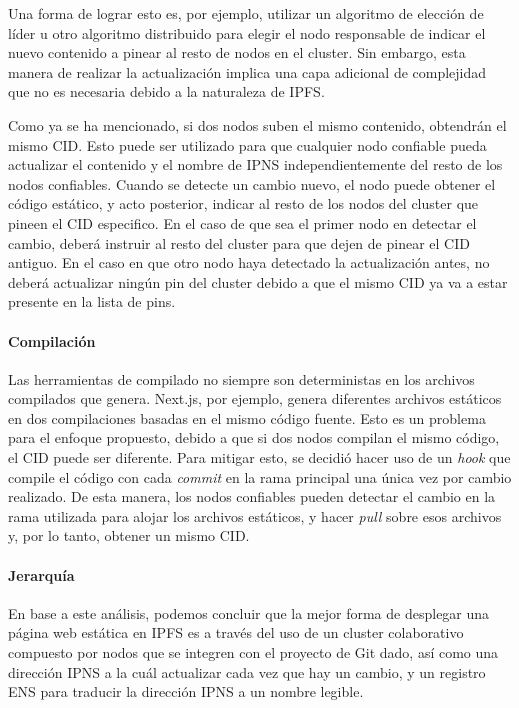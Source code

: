 Una forma de lograr esto es, por ejemplo, utilizar un algoritmo de elección de líder u otro algoritmo distribuido para elegir el nodo responsable de indicar el nuevo contenido a pinear al resto de nodos en el cluster. Sin embargo, esta manera de realizar la actualización implica una capa adicional de complejidad que no es necesaria debido a la naturaleza de IPFS.

Como ya se ha mencionado, si dos nodos suben el mismo contenido, obtendrán el mismo CID. Esto puede ser utilizado para que cualquier nodo confiable pueda actualizar el contenido y el nombre de IPNS independientemente del resto de los nodos confiables. Cuando se detecte un cambio nuevo, el nodo puede obtener el código estático, y acto posterior, indicar al resto de los nodos del cluster que pineen el CID especifico. En el caso de que sea el primer nodo en detectar el cambio, deberá instruir al resto del cluster para que dejen de pinear el CID antiguo. En el caso en que otro nodo haya detectado la actualización antes, no deberá actualizar ningún pin del cluster debido a que el mismo CID ya va a estar presente en la lista de pins.

\paragraph{Compilación}

Las herramientas de compilado no siempre son deterministas en los archivos compilados que genera. Next.js, por ejemplo, genera diferentes archivos estáticos en dos compilaciones basadas en el mismo código fuente. Esto es un problema para el enfoque propuesto, debido a que si dos nodos compilan el mismo código, el CID puede ser diferente. Para mitigar esto, se decidió hacer uso de un \textit{hook} que compile el código con cada \textit{commit} en la rama principal una única vez por cambio realizado. De esta manera, los nodos confiables pueden detectar el cambio en la rama utilizada para alojar los archivos estáticos, y hacer \textit{pull} sobre esos archivos y, por lo tanto, obtener un mismo CID.

\paragraph{Jerarquía}

En base a este análisis, podemos concluir que la mejor forma de desplegar una página web estática en IPFS es a través del uso de un cluster colaborativo compuesto por nodos que se integren con el proyecto de Git dado, así como una dirección IPNS a la cuál actualizar cada vez que hay un cambio, y un registro ENS para traducir la dirección IPNS a un nombre legible.

